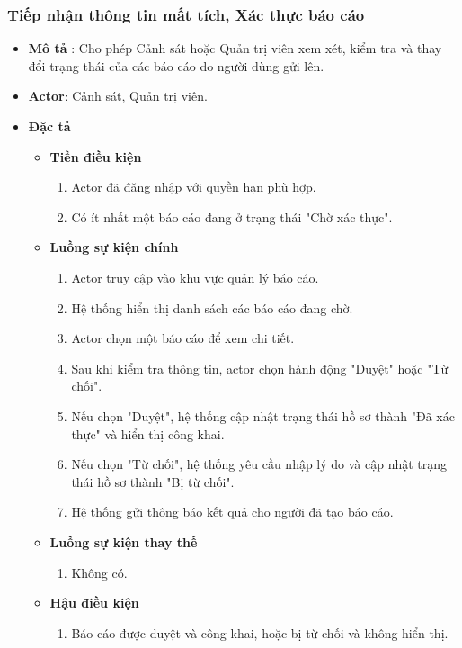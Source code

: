 \documentclass[../DoAn.tex]{subfiles}
\begin{document}
\subsubsection{Tiếp nhận thông tin mất tích, Xác thực báo cáo}
\begin{itemize}
	\item \textbf{Mô tả} : Cho phép Cảnh sát hoặc Quản trị viên xem xét, kiểm tra và thay đổi trạng thái của các báo cáo do người dùng gửi lên.
	\item \textbf{Actor}: Cảnh sát, Quản trị viên.
	\item \textbf{Đặc tả}
	      \begin{itemize}
		      \item \textbf{Tiền điều kiện}
		            \begin{enumerate}
			            \item Actor đã đăng nhập với quyền hạn phù hợp.
			            \item Có ít nhất một báo cáo đang ở trạng thái "Chờ xác thực".
		            \end{enumerate}
		      \item \textbf{Luồng sự kiện chính}
		            \begin{enumerate}
			            \item Actor truy cập vào khu vực quản lý báo cáo.
			            \item Hệ thống hiển thị danh sách các báo cáo đang chờ.
			            \item Actor chọn một báo cáo để xem chi tiết.
			            \item Sau khi kiểm tra thông tin, actor chọn hành động "Duyệt" hoặc "Từ chối".
			            \item Nếu chọn "Duyệt", hệ thống cập nhật trạng thái hồ sơ thành "Đã xác thực" và hiển thị công khai.
			            \item Nếu chọn "Từ chối", hệ thống yêu cầu nhập lý do và cập nhật trạng thái hồ sơ thành "Bị từ chối".
			            \item Hệ thống gửi thông báo kết quả cho người đã tạo báo cáo.
		            \end{enumerate}
		      \item \textbf{Luồng sự kiện thay thế}
		            \begin{enumerate}
			            \item Không có.
		            \end{enumerate}
		      \item \textbf{Hậu điều kiện}
		            \begin{enumerate}
			            \item Báo cáo được duyệt và công khai, hoặc bị từ chối và không hiển thị.
		            \end{enumerate}
	      \end{itemize}
\end{itemize}
\end{document}
